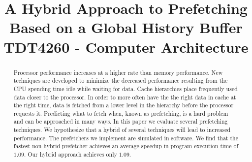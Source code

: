 \documentclass[technote]{IEEEtran}
\begin{document}
\title{A Hybrid Approach to Prefetching Based on a Global History Buffer\\ TDT4260 - Computer Architecture}

\author{

}

\maketitle

\begin{abstract}
  Processor performance increases at a higher rate than memory
  performance. New techniques are developed to minimize the decreased
  performance resulting from the CPU spending time idle while waiting
  for data. Cache hierarchies place frequently used data closer to the
  processor. In order to more often have the the right data in cache
  at the right time, data is fetched from a lower level in the
  hierarchy before the processor requests it. Predicting what to fetch
  when, known as prefetching, is a hard problem and can be approached
  in many ways. In this paper we evaluate several prefetching
  techniques. We hypothesize that a hybrid of several techniques will
  lead to increased performance. The prefetchers we implement are
  simulated in software. We find that the fastest non-hybrid
  prefetcher achieves an average speedup in program execution time of
  $1.09$. Our hybrid approach achieves only $1.09$.
\end{abstract}

\listoftodos










\end{document}
